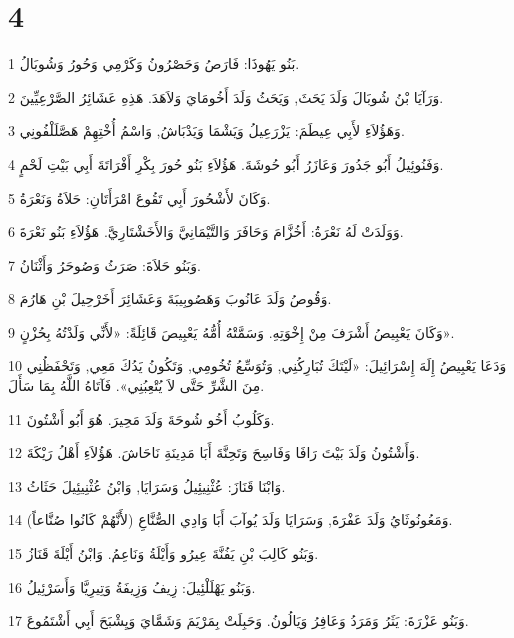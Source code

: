 \chapter{4}

\par 1 بَنُو يَهُوذَا: فَارَصُ وَحَصْرُونُ وَكَرْمِي وَحُورُ وَشُوبَالُ.
\par 2 وَرَآيَا بْنُ شُوبَالَ وَلَدَ يَحَثَ, وَيَحَثُ وَلَدَ أَخُومَايَ وَلاَهَدَ. هَذِهِ عَشَائِرُ الصَّرْعِيِّينَ.
\par 3 وَهَؤُلاَءِ لأَبِي عِيطَمَ: يَزْرَعِيلُ وَيَشْمَا وَيَدْبَاشُ, وَاسْمُ أُخْتِهِمْ هَصَّلَلْفُونِي.
\par 4 وَفَنُوئِيلُ أَبُو جَدُورَ وَعَازَرُ أَبُو حُوشَةَ. هَؤُلاَءِ بَنُو حُورَ بِكْرِ أَفْرَاتَةَ أَبِي بَيْتِ لَحْمٍ.
\par 5 وَكَانَ لأَشْحُورَ أَبِي تَقُوعَ امْرَأَتَانِ: حَلاَةُ وَنَعْرَةُ.
\par 6 وَوَلَدَتْ لَهُ نَعْرَةُ: أَخُزَّامَ وَحَافَرَ وَالتَّيْمَانِيَّ وَالأَخَشْتَارِيَّ. هَؤُلاَءِ بَنُو نَعْرَةَ.
\par 7 وَبَنُو حَلاَةَ: صَرَثُ وَصُوحَرُ وَأَثْنَانُ.
\par 8 وَقُوصُ وَلَدَ عَانُوبَ وَهَصُوبِيبَةَ وَعَشَائِرَ أَخَرْحِيلَ بْنِ هَارُمَ.
\par 9 وَكَانَ يَعْبِيصُ أَشْرَفَ مِنْ إِخْوَتِهِ. وَسَمَّتْهُ أُمُّهُ يَعْبِيصَ قَائِلَةً: «لأَنِّي وَلَدْتُهُ بِحُزْنٍ».
\par 10 وَدَعَا يَعْبِيصُ إِلَهَ إِسْرَائِيلَ: «لَيْتَكَ تُبَارِكُنِي, وَتُوَسِّعُ تُخُومِي, وَتَكُونُ يَدُكَ مَعِي, وَتَحْفَظُنِي مِنَ الشَّرِّ حَتَّى لاَ يُتْعِبُنِي». فَآتَاهُ اللَّهُ بِمَا سَأَلَ.
\par 11 وَكَلُوبُ أَخُو شُوحَةَ وَلَدَ مَحِيرَ. هُوَ أَبُو أَشْتُونَ.
\par 12 وَأَشْتُونُ وَلَدَ بَيْتَ رَافَا وَفَاسِحَ وَتَحِنَّةَ أَبَا مَدِينَةِ نَاحَاشَ. هَؤُلاَءِ أَهْلُ رَيْكَةَ.
\par 13 وَابْنَا قَنَازَ: عُثْنِيئِيلُ وَسَرَايَا, وَابْنُ عُثْنِيئِيلَ حَثَاثُ.
\par 14 وَمَعُونُوثَايُ وَلَدَ عَفْرَةَ, وَسَرَايَا وَلَدَ يُوآبَ أَبَا وَادِي الصُّنَّاعِ (لأَنَّهُمْ كَانُوا صُنَّاعاً).
\par 15 وَبَنُو كَالِبَ بْنِ يَفُنَّةَ عِيرُو وَأَيْلَةُ وَنَاعِمُ. وَابْنُ أَيْلَةَ قَنَازُ.
\par 16 وَبَنُو يَهْلَلْئِيلَ: زِيفُ وَزِيفَةُ وَتِيرِيَّا وَأَسَرْئِيلُ.
\par 17 وَبَنُو عَزْرَةَ: يَثَرُ وَمَرَدُ وَعَافِرُ وَيَالُونُ. وَحَبِلَتْ بِمَرْيَمَ وَشَمَّايَ وَيِشْبَحَ أَبِي أَشْتَمُوعَ.
